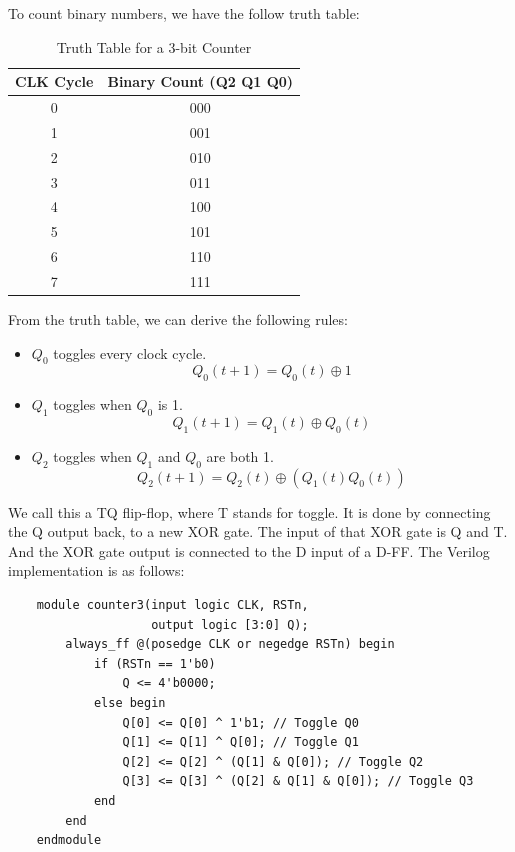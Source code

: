 \documentclass[11pt]{report}
\begin{document}
\begin{definition}[Counters]
    To count binary numbers, we have the follow truth table:
    \begin{table}[h!]
        \centering
        \begin{tabular}{|c|c|}
            \hline
            CLK Cycle & Binary Count (Q2 Q1 Q0) \\
            \hline
            0 & 000 \\
            1 & 001 \\
            2 & 010 \\
            3 & 011 \\
            4 & 100 \\
            5 & 101 \\
            6 & 110 \\
            7 & 111 \\
            \hline
        \end{tabular}
        \caption{Truth Table for a 3-bit Counter}
        \label{tab:3_bit_counter_truth_table}
    \end{table}
    From the truth table, we can derive the following rules:
    \begin{itemize}
        \item $Q_0$ toggles every clock cycle.
        $$
        Q_0(t+1) = Q_0(t) \oplus 1
        $$
        \item $Q_1$ toggles when $Q_0$ is 1.
        $$
        Q_1(t+1) = Q_1(t) \oplus Q_0(t)
        $$
        \item $Q_2$ toggles when $Q_1$ and $Q_0$ are both 1.
        $$
        Q_2(t+1) = Q_2(t) \oplus (Q_1(t) Q_0(t))
        $$
    \end{itemize}
    We call this a TQ flip-flop, where T stands for toggle. It is done by connecting the Q output back, to a new XOR gate. The input of that XOR gate is Q and T. And the XOR gate output is connected to the D input of a D-FF. The Verilog implementation is as follows:
    \begin{verbatim}
    module counter3(input logic CLK, RSTn,
                    output logic [3:0] Q);
        always_ff @(posedge CLK or negedge RSTn) begin
            if (RSTn == 1'b0)
                Q <= 4'b0000;
            else begin
                Q[0] <= Q[0] ^ 1'b1; // Toggle Q0
                Q[1] <= Q[1] ^ Q[0]; // Toggle Q1
                Q[2] <= Q[2] ^ (Q[1] & Q[0]); // Toggle Q2
                Q[3] <= Q[3] ^ (Q[2] & Q[1] & Q[0]); // Toggle Q3
            end
        end
    endmodule
    \end{verbatim}
\end{definition}
\end{document}
